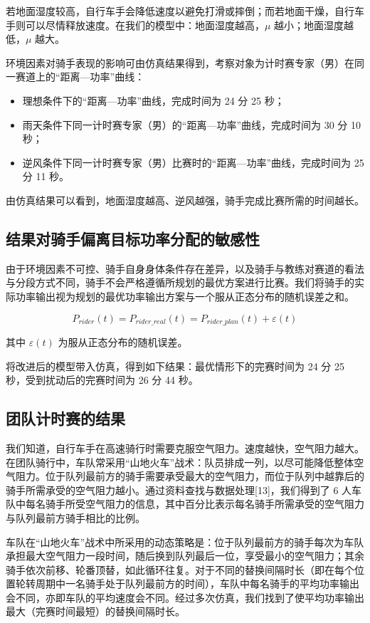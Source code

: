 \documentclass[11pt,a4paper]{ctexart}
\begin{document}
若地面湿度较高，自行车手会降低速度以避免打滑或摔倒；而若地面干燥，自行车手则可以尽情释放速度。在我们的模型中：地面湿度越高，$\mu$ 越小；地面湿度越低，$\mu$ 越大。

环境因素对骑手表现的影响可由仿真结果得到，考察对象为计时赛专家（男）在同一赛道上的“距离—功率”曲线：

\begin{itemize}
\item 理想条件下的“距离—功率”曲线，完成时间为 24 分 25 秒；
\item 雨天条件下同一计时赛专家（男）的“距离—功率”曲线，完成时间为 30 分 10 秒；
\item 逆风条件下同一计时赛专家（男）比赛时的“距离—功率”曲线，完成时间为 25 分 11 秒。
\end{itemize}

由仿真结果可以看到，地面湿度越高、逆风越强，骑手完成比赛所需的时间越长。

\subsection{结果对骑手偏离目标功率分配的敏感性}

由于环境因素不可控、骑手自身身体条件存在差异，以及骑手与教练对赛道的看法与分段方式不同，骑手不会严格遵循所规划的最优方案进行比赛。我们将骑手的实际功率输出视为规划的最优功率输出方案与一个服从正态分布的随机误差之和。

\begin{equation}
P_{rider}(t)=P_{rider\_real}(t)=P_{rider\_plan}(t)+\varepsilon(t)
\end{equation}

其中 $\varepsilon(t)$ 为服从正态分布的随机误差。

将改进后的模型带入仿真，得到如下结果：最优情形下的完赛时间为 24 分 25 秒，受到扰动后的完赛时间为 26 分 44 秒。

\subsection{团队计时赛的结果}

我们知道，自行车手在高速骑行时需要克服空气阻力。速度越快，空气阻力越大。在团队骑行中，车队常采用“山地火车”战术：队员排成一列，以尽可能降低整体空气阻力。位于队列最前方的骑手需要承受最大的空气阻力，而位于队列中越靠后的骑手所需承受的空气阻力越小。通过资料查找与数据处理[13]，我们得到了 6 人车队中每名骑手所受空气阻力的信息，其中百分比表示每名骑手所需承受的空气阻力与队列最前方骑手相比的比例。

车队在“山地火车”战术中所采用的动态策略是：位于队列最前方的骑手每次为车队承担最大空气阻力一段时间，随后换到队列最后一位，享受最小的空气阻力；其余骑手依次前移、轮番顶替，如此循环往复。对于不同的替换间隔时长（即在每个位置轮转周期中一名骑手处于队列最前方的时间），车队中每名骑手的平均功率输出会不同，亦即车队的平均速度会不同。经过多次仿真，我们找到了使平均功率输出最大（完赛时间最短）的替换间隔时长。
\end{document}

